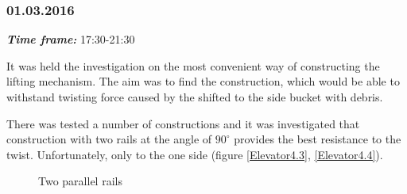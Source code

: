 \subsubsection{01.03.2016}
\textit{\textbf{Time frame:}} 17:30-21:30 

It was held the investigation on the most convenient way of constructing the lifting mechanism. The aim was to find the construction, which would be able to withstand twisting force caused by the shifted to the side bucket with debris.

There was tested a number of constructions and it was investigated that construction with two rails at the angle of $90^\circ$ provides the best resistance to the twist. Unfortunately, only to the one side (figure \ref{Elevator4.3}, \ref{Elevator4.4}).

\begin{figure}[H]
	\begin{minipage}[h]{0.47\linewidth}
		\caption{Two parallel rails}
		\label{Elevator4.1}
	\end{minipage}
	\hfill
	\begin{minipage}[h]{0.47\linewidth}

\end{minipage}
\end{figure}

